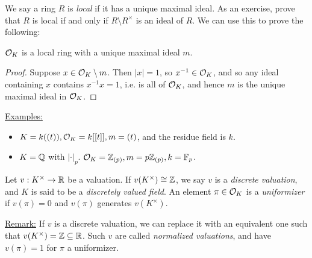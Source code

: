 \documentclass[10pt,a4paper]{article}
\begin{document}
We say a ring $R$ is \emph{local} if it has a unique maximal ideal. As an exercise, prove that $R$ is local if and only if $R\setminus R^\times$ is an ideal of $R$. We can use this to prove the following:

\begin{corollary}
  $\mathcal{O}_K$ is a local ring with a unique maximal ideal $m$.
\end{corollary}
\begin{proof}
  Suppose $x \in \mathcal{O}_K \setminus m$. Then $|x| = 1$, so $x^{-1} \in \mathcal{O}_K$, and so any ideal containing $x$ contains $x^{-1}x = 1$, i.e. is all of $\mathcal{O}_K$, and hence $m$ is the unique maximal ideal in $\mathcal{O}_K$.
\end{proof}

\underline{Examples:}
\begin{itemize}
  \item $K = k((t)), \mathcal{O}_K = k[[t]], m = (t)$, and the residue field is $k$.
  \item $K = \mathbb{Q}$ with $|\cdot|_p$. $\mathcal{O}_K = \mathbb{Z}_{(p)}, m = p\mathbb{Z}_{(p)}, k = \mathbb{F}_p$.
\end{itemize}

\begin{definition}
  Let $v : K^\times \to \mathbb{R}$ be a valuation. If $v(K^\times) \cong \mathbb{Z}$, we say $v$ is a \emph{discrete valuation}, and $K$ is said to be a \emph{discretely valued field}. An element $\pi \in \mathcal{O}_K$ is a \emph{uniformizer} if $v(\pi) = 0$ and $v(\pi)$ generates $v(K^\times)$.
\end{definition}
\underline{Remark:} If $v$ is a discrete valuation, we can replace it with an equivalent one such that $v(K^\times) = \mathbb{Z} \subseteq \mathbb{R}$. Such $v$ are called \emph{normalized valuations}, and have $v(\pi) = 1$ for $\pi$ a uniformizer.
\end{document}
